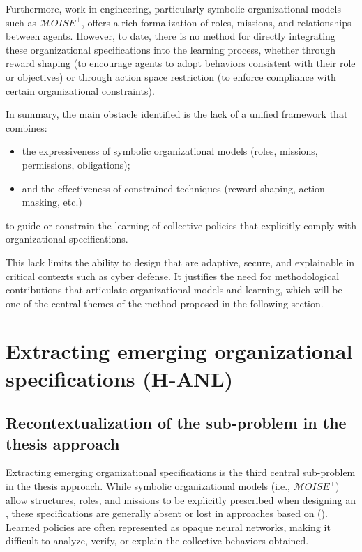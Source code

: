 Furthermore, work in  engineering, particularly symbolic organizational models such as $\mathcal{M}OISE^+$, offers a rich formalization of roles, missions, and relationships between agents. However, to date, there is no method for directly integrating these organizational specifications into the  learning process, whether through reward shaping (to encourage agents to adopt behaviors consistent with their role or objectives) or through action space restriction (to enforce compliance with certain organizational constraints).

In summary, the main obstacle identified is the lack of a unified framework that combines:
\begin{itemize}
  \item the expressiveness of symbolic organizational models (roles, missions, permissions, obligations);
  \item and the effectiveness of constrained  techniques (reward shaping, action masking, etc.)
\end{itemize}
to guide or constrain the learning of collective policies that explicitly comply with organizational specifications.

This lack limits the ability to design  that are adaptive, secure, and explainable in critical contexts such as cyber defense. It justifies the need for methodological contributions that articulate organizational models and learning, which will be one of the central themes of the method proposed in the following section.


\section{Extracting emerging organizational specifications (H-ANL)}

\subsection*{Recontextualization of the sub-problem in the thesis approach}

Extracting emerging organizational specifications is the third central sub-problem in the thesis approach. While symbolic organizational models (i.e., $\mathcal{M}OISE^+$) allow structures, roles, and missions to be explicitly prescribed when designing an , these specifications are generally absent or lost in approaches based on  (). Learned policies are often represented as opaque neural networks, making it difficult to analyze, verify, or explain the collective behaviors obtained.

